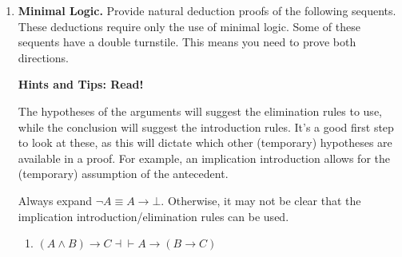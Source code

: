 \documentclass[11pt]{report}
\begin{document}
\begin{enumerate}
\begin{enumerate}
		\item Extend the proof above, through the use of implication introduction, to a proof of the original sequent.
		
		\hspace{0.2cm}{\bf Solution}

		To prove the original sequent, we have to undo each application of the deduction theorem i.e. introduce the implication back to the consequent. 

		\begin{mdframed}
			\begin{center}
				$\begin{array}{c}
					\infer[\to I,3]{(P \to Q) \to (\lnot Q \to \lnot P)}
						{\infer[\to I,2]{\lnot Q \to \lnot P}
							{\infer[\to I,1]{\lnot P}
								{\infer[\MP]{\bot}
								{\infer[\MP]{Q}{\infer[1]{\cancel{P}}{} & \infer[3]{\cancel{P \to Q}}{}} & \infer[2]{\cancel{\lnot Q}}{}}}								
							}}
				\end{array}$
			\end{center}
		\end{mdframed}

	\end{enumerate}	
	
	\newpage
	\item \textbf{Minimal Logic.} Provide natural deduction proofs of the following sequents. These deductions require only the use of minimal logic. Some of these sequents have a double turnstile. This means you need to prove both directions. 
	
	\vspace{0.2cm}

	{\bf Hints and Tips: Read!}

	The hypotheses of the arguments will suggest the elimination rules to use, while the conclusion will suggest the introduction rules. It's a good first step to look at these, as this will dictate which other (temporary) hypotheses are available in a proof. For example, an implication introduction allows for the (temporary) assumption of the antecedent. 

	Always expand $\lnot A \equiv A \to \bot$. Otherwise, it may not be clear that the implication introduction/elimination rules can be used.

	\begin{enumerate}
		\item $(A \land B) \to C \dashv\vdash A \to (B \to C) $
		
		\hspace{0.2cm}{\bf Solution}
		

\end{enumerate}
\end{enumerate}
\end{document}
